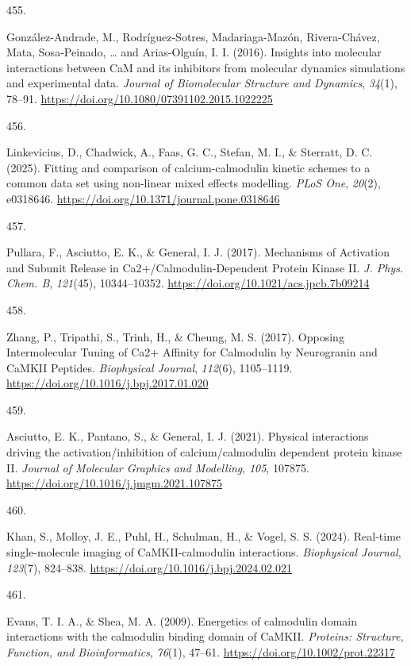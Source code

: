 \documentclass[
  11pt,
  letterpaper,
]{scrreprt}
\newlength{\cslhangindent}
\newlength{\csllabelwidth}
\newenvironment{CSLReferences}[2] %
 {\begin{list}{}{%
  \setlength{\itemindent}{0pt}
  \setlength{\leftmargin}{0pt}
  \setlength{\parsep}{0pt}
  \ifodd #1
   \setlength{\leftmargin}{\cslhangindent}
   \setlength{\itemindent}{-1\cslhangindent}
  \fi
  \setlength{\itemsep}{#2\baselineskip}}}
 {\end{list}}
\newcommand{\CSLLeftMargin}[1]{\parbox[t]{\csllabelwidth}{\strut#1\strut}}
\newcommand{\CSLRightInline}[1]{\parbox[t]{\linewidth - \csllabelwidth}{\strut#1\strut}}
\begin{document}
\begin{CSLReferences}{0}{0}
\CSLLeftMargin{455. }%
\CSLRightInline{González-Andrade, M., Rodríguez-Sotres, Madariaga-Mazón,
Rivera-Chávez, Mata, Sosa-Peinado, \ldots{} and Arias-Olguín, I. I.
(2016). Insights into molecular interactions between {CaM} and its
inhibitors from molecular dynamics simulations and experimental data.
\emph{Journal of Biomolecular Structure and Dynamics}, \emph{34}(1),
78--91. \url{https://doi.org/10.1080/07391102.2015.1022225}}

\CSLLeftMargin{456. }%
\CSLRightInline{Linkevicius, D., Chadwick, A., Faas, G. C., Stefan, M.
I., \& Sterratt, D. C. (2025). Fitting and comparison of
calcium-calmodulin kinetic schemes to a common data set using non-linear
mixed effects modelling. \emph{PLoS One}, \emph{20}(2), e0318646.
\url{https://doi.org/10.1371/journal.pone.0318646}}

\CSLLeftMargin{457. }%
\CSLRightInline{Pullara, F., Asciutto, E. K., \& General, I. J. (2017).
Mechanisms of {Activation} and {Subunit Release} in
{Ca2}+/{Calmodulin-Dependent Protein Kinase II}. \emph{J. Phys. Chem.
B}, \emph{121}(45), 10344--10352.
\url{https://doi.org/10.1021/acs.jpcb.7b09214}}

\CSLLeftMargin{458. }%
\CSLRightInline{Zhang, P., Tripathi, S., Trinh, H., \& Cheung, M. S.
(2017). Opposing {Intermolecular Tuning} of {Ca2}+ {Affinity} for
{Calmodulin} by {Neurogranin} and {CaMKII Peptides}. \emph{Biophysical
Journal}, \emph{112}(6), 1105--1119.
\url{https://doi.org/10.1016/j.bpj.2017.01.020}}

\CSLLeftMargin{459. }%
\CSLRightInline{Asciutto, E. K., Pantano, S., \& General, I. J. (2021).
Physical interactions driving the activation/inhibition of
calcium/calmodulin dependent protein kinase {II}. \emph{Journal of
Molecular Graphics and Modelling}, \emph{105}, 107875.
\url{https://doi.org/10.1016/j.jmgm.2021.107875}}

\CSLLeftMargin{460. }%
\CSLRightInline{Khan, S., Molloy, J. E., Puhl, H., Schulman, H., \&
Vogel, S. S. (2024). Real-time single-molecule imaging of
{CaMKII-calmodulin} interactions. \emph{Biophysical Journal},
\emph{123}(7), 824--838.
\url{https://doi.org/10.1016/j.bpj.2024.02.021}}

\CSLLeftMargin{461. }%
\CSLRightInline{Evans, T. I. A., \& Shea, M. A. (2009). Energetics of
calmodulin domain interactions with the calmodulin binding domain of
{CaMKII}. \emph{Proteins: Structure, Function, and Bioinformatics},
\emph{76}(1), 47--61. \url{https://doi.org/10.1002/prot.22317}}


\end{CSLReferences}
\end{document}
